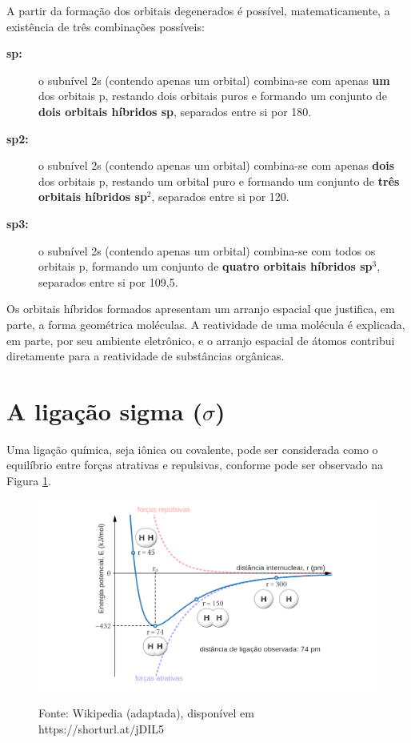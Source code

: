 A partir da formação dos orbitais degenerados é possível, matematicamente, a existência de três combinações possíveis:

\begin{description}
	\item[\textbf{sp:}] o subnível 2s (contendo apenas um orbital) combina-se com apenas \textbf{um} dos orbitais p, restando dois orbitais puros e formando um conjunto de \textbf{dois orbitais híbridos sp}, separados entre si por 180\textcelsius.
	\item[\textbf{sp2:}] o subnível 2s (contendo apenas um orbital) combina-se com apenas \textbf{dois} dos orbitais p, restando um orbital puro e formando um conjunto de \textbf{três orbitais híbridos sp$^2$}, separados entre si por 120\textcelsius.
	\item[\textbf{sp3:}] o subnível 2s (contendo apenas um orbital) combina-se com todos os orbitais p, formando um conjunto de \textbf{quatro orbitais híbridos sp$^3$}, separados entre si por 109,5\textcelsius.
\end{description}

Os orbitais híbridos formados apresentam um arranjo espacial que justifica, em parte, a forma geométrica moléculas. A reatividade de uma molécula é explicada, em parte, por seu ambiente eletrônico, e o arranjo espacial de átomos contribui diretamente para a reatividade de substâncias orgânicas.

\section{A ligação sigma ($\sigma$)}

Uma ligação química, seja iônica ou covalente, pode ser considerada como o equilíbrio entre forças atrativas e repulsivas, conforme pode ser observado na Figura \ref{fig:dar}.

\begin{figure}[H]
	\centering
	\caption{Diagrama Lennard-Jones \cite{Lennard-Jones_1931} de forças atrativas e respulsivas na formação da molécula de H$_2$; válido para as demais ligaçãoes covalentes, respeitando a natureza de cada átomo. Observe que 1 pm = 10$^{-12}$ m}
	\vspace{0.5cm}
	\includegraphics[width=1\linewidth]{imagens/dar.png}
	\label{fig:dar}
	\caption*{Fonte: Wikipedia (adaptada), disponível em https://shorturl.at/jDIL5}
\end{figure}

